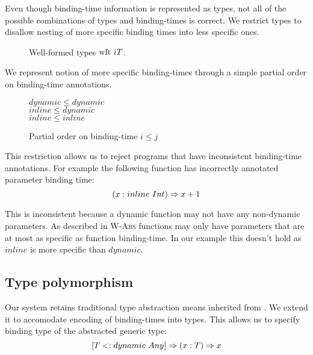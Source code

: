 Even though binding-time information is represented as types, not all
of the possible combinations of types and binding-times is correct.
We restrict types to disallow nesting of more specific binding times
into less specific ones.

\begin{figure}[H]

  {}

  {}

  {}
\caption{Well-formed types $\text{wft}\ i T$.}
\end{figure}

We represent notion of more specific binding-times through
a simple partial order on binding-time annotations.

\begin{figure}[H]
  \begin{center}
  $ dynamic \leq dynamic $ \\
  $ inline  \leq dynamic $ \\
  $ inline  \leq inline  $
  \end{center}
\caption{Partial order on binding-time $i \leq j$}
\end{figure}

This restriction allows us to reject programs that have inconsistent binding-time annotations.
For example the following function has incorrectly annotated parameter binding time:
\begin{equation}\nonumber
    (x: inline\ Int) \Rightarrow x + 1
\end{equation}

This is inconsistent because a dynamic function may not have any non-dynamic parameters.
As described in \textsc{W-Abs} functions may only have parameters that are at most as specific
as function binding-time. In our example this doesn't hold as $inline$ is more
specific than $dynamic$.

\subsection{Type polymorphism}

Our system retains traditional type abstraction means inherited from \fsub.
We extend it to accomodate encoding of binding-times into types. This allows
us to specify binding type of the abstracted generic type:
\begin{equation}\nonumber
  [T <: dynamic\ Any] \Rightarrow (x: T) \Rightarrow x
\end{equation}

